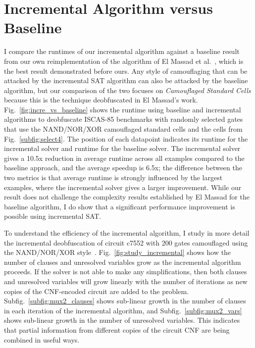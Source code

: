 \documentclass[proposal]{umassthesis}  %
\begin{document}
\section{Incremental Algorithm versus Baseline}

I compare the runtimes of our incremental algorithm against a baseline result from our own reimplementation of the algorithm of El Massad et al.~\cite{elmassad-15}, which is the best result demonstrated before ours. {Any style of camouflaging that can be attacked by the incremental SAT algorithm can also be attacked by the baseline algorithm, but our comparison of the two focuses } on \textit{Camouflaged Standard Cells} because this is the technique deobfuscated in El Massad's work.
 Fig.~\ref{fig:incre_vs_baseline} shows the runtime using baseline and incremental algorithms to deobfuscate ISCAS-85 benchmarks with randomly selected gates that use the NAND/NOR/XOR camouflaged standard cells and the cells from Fig.~\ref{subfig:select4}. The position of each datapoint indicates its runtime for the incremental solver and runtime for the baseline solver. {The incremental solver gives a 10.5x reduction in average runtime across all examples compared to the baseline approach, and the average speedup is 6.5x; the difference between the two metrics is that average runtime is strongly influenced by the largest examples, where the incremental solver gives a larger improvement. While our result does not challenge the complexity results established by El Massad for the baseline algorithm, I do show that a significant performance improvement is possible using incremental SAT.}




To understand the efficiency of the incremental algorithm, I study in more detail the incremental deobfuscation of circuit c7552 with 200 gates camouflaged using the NAND/NOR/XOR style~\cite{rajendran-13}. Fig.~\ref{fig:study_incremental} shows how the number of clauses and unresolved variables grow as the incremental algorithm proceeds. If the solver is not able to make any simplifications, then both clauses and unresolved variables will grow linearly with the number of iterations as new copies of the CNF-encoded circuit are added to the problem. Subfig.~\ref{subfig:mux2_clauses} shows sub-linear growth in the number of clauses in each iteration of the incremental algorithm, and Subfig.~\ref{subfig:mux2_vars} shows sub-linear growth in the number of unresolved variables. This indicates that partial information from different copies of the circuit CNF are being combined in useful ways. 
\end{document}
